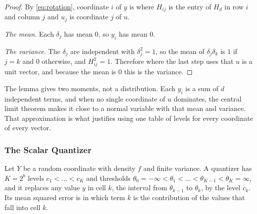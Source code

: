 \begin{proof}
By \cref{eq:rotation}, coordinate $i$ of $y$ is
where $H_{ij}$ is the entry of $H_d$ in row $i$ and column $j$ and $u_j$ is
coordinate $j$ of $u$.

\emph{The mean.} Each $\delta_j$ has mean $0$, so $y_i$ has mean $0$.

\emph{The variance.} The $\delta_j$ are independent with $\delta_j^2 = 1$, so
the mean of $\delta_j \delta_k$ is $1$ if $j = k$ and $0$ otherwise, and
$H_{ij}^2 = 1$. Therefore
where the last step uses that $u$ is a unit vector, and because the mean is
$0$ this is the variance.
\end{proof}

The lemma gives two moments, not a distribution. Each $y_i$ is a sum of $d$
independent terms, and when no single coordinate of $u$ dominates, the
central limit theorem makes it close to a normal variable with that mean and
variance. That approximation is what justifies using one table of levels for
every coordinate of every vector.

\subsubsection{The Scalar Quantizer}

Let $Y$ be a random coordinate with density $f$ and finite variance. A
quantizer has $K = 2^b$ levels $c_1 < \dots < c_K$ and thresholds
$\theta_0 = -\infty < \theta_1 < \dots < \theta_{K-1} < \theta_K = \infty$,
and it replaces any value $y$ in cell $k$, the interval from $\theta_{k-1}$
to $\theta_k$, by the level $c_k$. Its mean squared error is
in which term $k$ is the contribution of the values that fall into cell $k$.

